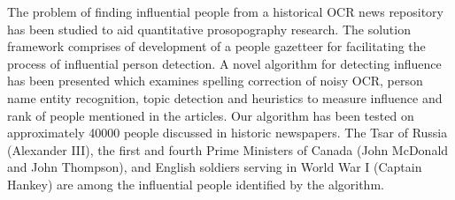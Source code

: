 The problem of finding influential people from a historical OCR news repository has been studied to aid quantitative prosopography research. The solution framework comprises of development of a people gazetteer for facilitating the process of influential person detection. A novel algorithm for detecting influence has been presented which examines spelling correction of noisy OCR, person name entity recognition, topic detection and heuristics to measure influence and rank of people mentioned in the articles. Our algorithm has been tested on approximately 40000 people discussed in historic newspapers. The Tsar of Russia (Alexander III), the first and fourth Prime Ministers of Canada (John McDonald and John Thompson), and English soldiers serving in World War I (Captain Hankey) are among the influential people identified by the algorithm.




%
%
